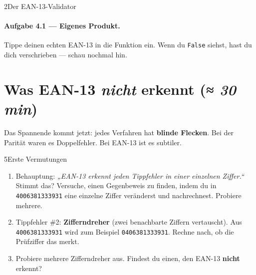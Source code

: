 \begin{pythoneinheit}{2}{Der EAN-13-Validator}

\paragraph{Aufgabe 4.1 — Eigenes Produkt.}
Tippe deinen echten EAN-13 in die Funktion ein. Wenn du \texttt{False}
siehst, hast du dich verschrieben — schau nochmal hin.
\end{pythoneinheit}

\section{Was EAN-13 \emph{nicht} erkennt \normalfont(\textit{≈ 30 min})}

Das Spannende kommt jetzt: jedes Verfahren hat \textbf{blinde Flecken}.
Bei der Parität waren es Doppelfehler. Bei EAN-13 ist es subtiler.

\begin{bleistiftuebung}{5}{Erste Vermutungen}
\begin{enumerate}[label=(\alph*), leftmargin=*]
\item Behauptung: \emph{„EAN-13 erkennt jeden Tippfehler in einer
  einzelnen Ziffer.“} Stimmt das? Versuche, einen Gegenbeweis zu
  finden, indem du in \texttt{4006381333931} eine einzelne Ziffer
  veränderst und nachrechnest. Probiere mehrere.
\item Tippfehler \#2: \textbf{Zifferndreher} (zwei benachbarte Ziffern
  vertauscht). Aus \texttt{4006381333931} wird zum Beispiel
  \texttt{0406381333931}. Rechne nach, ob die Prüfziffer das merkt.
\item Probiere mehrere Zifferndreher aus. Findest du einen, den EAN-13
  \textbf{nicht} erkennt?
\end{enumerate}
\end{bleistiftuebung}

